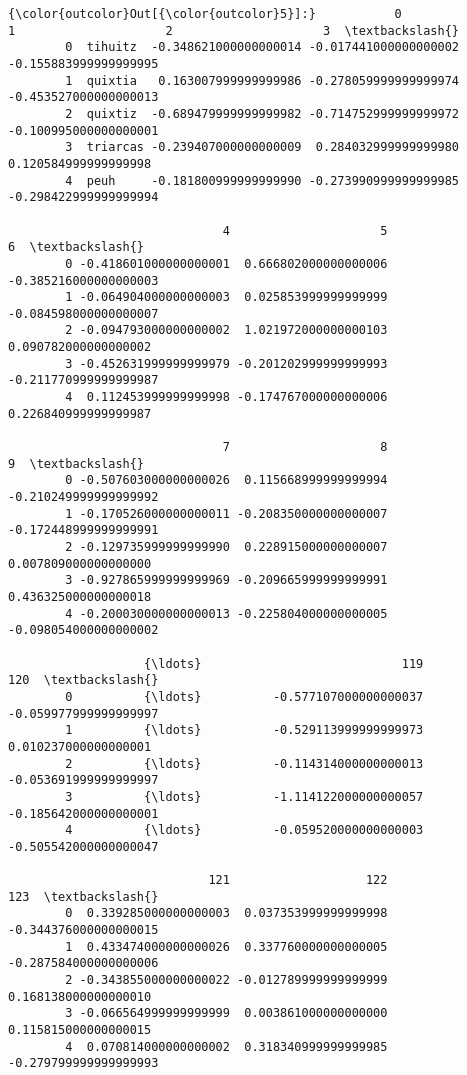 \documentclass[11pt]{article}
\begin{document}
\begin{Verbatim}[commandchars=\\\{\}]
{\color{outcolor}Out[{\color{outcolor}5}]:}           0                     1                     2                     3  \textbackslash{}
        0  tihuitz  -0.348621000000000014 -0.017441000000000002 -0.155883999999999995   
        1  quixtia   0.163007999999999986 -0.278059999999999974 -0.453527000000000013   
        2  quixtiz  -0.689479999999999982 -0.714752999999999972 -0.100995000000000001   
        3  triarcas -0.239407000000000009  0.284032999999999980  0.120584999999999998   
        4  peuh     -0.181800999999999990 -0.273990999999999985 -0.298422999999999994   
        
                              4                     5                     6  \textbackslash{}
        0 -0.418601000000000001  0.666802000000000006 -0.385216000000000003   
        1 -0.064904000000000003  0.025853999999999999 -0.084598000000000007   
        2 -0.094793000000000002  1.021972000000000103  0.090782000000000002   
        3 -0.452631999999999979 -0.201202999999999993 -0.211770999999999987   
        4  0.112453999999999998 -0.174767000000000006  0.226840999999999987   
        
                              7                     8                     9  \textbackslash{}
        0 -0.507603000000000026  0.115668999999999994 -0.210249999999999992   
        1 -0.170526000000000011 -0.208350000000000007 -0.172448999999999991   
        2 -0.129735999999999990  0.228915000000000007  0.007809000000000000   
        3 -0.927865999999999969 -0.209665999999999991  0.436325000000000018   
        4 -0.200030000000000013 -0.225804000000000005 -0.098054000000000002   
        
                   {\ldots}                            119                   120  \textbackslash{}
        0          {\ldots}          -0.577107000000000037 -0.059977999999999997   
        1          {\ldots}          -0.529113999999999973  0.010237000000000001   
        2          {\ldots}          -0.114314000000000013 -0.053691999999999997   
        3          {\ldots}          -1.114122000000000057 -0.185642000000000001   
        4          {\ldots}          -0.059520000000000003 -0.505542000000000047   
        
                            121                   122                   123  \textbackslash{}
        0  0.339285000000000003  0.037353999999999998 -0.344376000000000015   
        1  0.433474000000000026  0.337760000000000005 -0.287584000000000006   
        2 -0.343855000000000022 -0.012789999999999999  0.168138000000000010   
        3 -0.066564999999999999  0.003861000000000000  0.115815000000000015   
        4  0.070814000000000002  0.318340999999999985 -0.279799999999999993   
        

\end{Verbatim}
\end{document}
